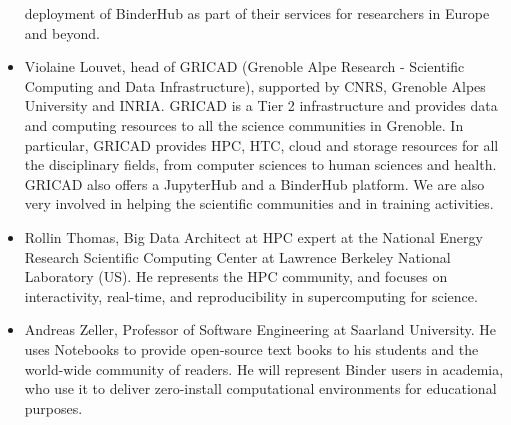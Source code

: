\begin{itemize}
  deployment of BinderHub as part of their services for researchers in Europe
  and beyond.
\item Violaine Louvet, head of GRICAD (Grenoble Alpe Research -
 Scientific Computing and Data Infrastructure), supported by
 CNRS, Grenoble Alpes University and INRIA. GRICAD is a Tier 2
 infrastructure and provides data and computing resources to all the
 science communities in Grenoble. In particular, GRICAD provides HPC,
 HTC, cloud and storage resources for all the disciplinary fields,
 from computer sciences to human sciences and health. GRICAD
 also offers a JupyterHub and a BinderHub platform. We are also very
 involved in helping the scientific communities and in training activities.
 \item Rollin Thomas, Big Data Architect at HPC expert at the National Energy
  Research Scientific Computing Center at Lawrence Berkeley National Laboratory
  (US). He represents the HPC community, and focuses on interactivity,
  real-time, and reproducibility in supercomputing for science.
\item Andreas Zeller, Professor of Software Engineering at Saarland University. He uses Notebooks
  to provide open-source text books to his students and the world-wide
  community of readers. He will represent Binder users in academia, who use it
  to deliver zero-install computational environments for educational
  purposes.
\end{itemize}
